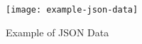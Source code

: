  
 	\begin{figure} 
 		\centering
 		\texttt{[image: example-json-data]}
 		\caption{Example of JSON Data}
 		\label{fig:example-json-data}
 	\end{figure}
 